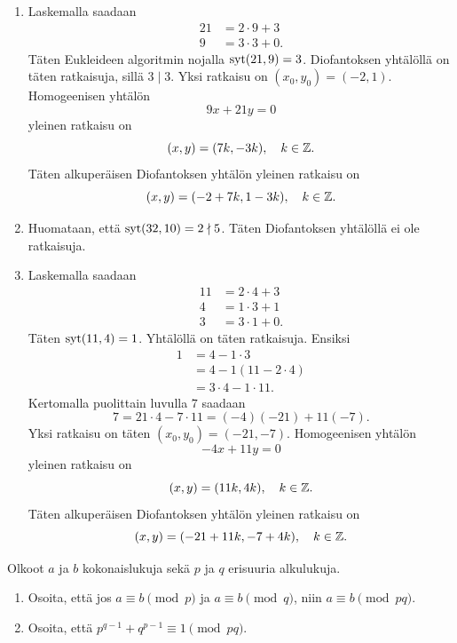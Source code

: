 \documentclass[11pt,a4paper]{amsart}
\begin{document}
\begin{solution}
  \leavevmode\par
  \begin{enumerate}[label=(\alph*), nosep]
    \item Laskemalla saadaan
      \[
        \begin{aligned}
          21 &= 2 \cdot 9 + 3 \\
          9 &= 3 \cdot 3 + 0.
        \end{aligned}
      \]
      Täten Eukleideen algoritmin nojalla \(\operatorname{syt}(21, 9) = 3\). Diofantoksen
      yhtälöllä on täten ratkaisuja, sillä \(3 \mid 3\). Yksi ratkaisu on
      \((x_0, y_0) = (-2, 1)\). Homogeenisen yhtälön
      \[
        9x + 21y = 0
      \]
      yleinen ratkaisu on
      \[
        (x, y) = (7k, -3k), \quad k \in \mathbb{Z}.
      \]
      Täten alkuperäisen Diofantoksen yhtälön yleinen ratkaisu on
      \[
        (x, y) = (-2 + 7k, 1 - 3k), \quad k \in \mathbb{Z}.
      \]
    \item Huomataan, että \(\operatorname{syt}(32, 10) = 2 \nmid 5\). Täten Diofantoksen
      yhtälöllä ei ole ratkaisuja.
    \item Laskemalla saadaan
      \[
        \begin{aligned}
          11 &= 2 \cdot 4 + 3 \\
          4 &= 1 \cdot 3 + 1 \\
          3 &= 3 \cdot 1 + 0.
        \end{aligned}
      \]
      Täten \(\operatorname{syt}(11, 4) = 1\). Yhtälöllä on täten ratkaisuja. Ensiksi
      \[
        \begin{aligned}
          1 &= 4 - 1 \cdot 3 \\
          &= 4 - 1(11 - 2 \cdot 4) \\
          &= 3 \cdot 4 - 1 \cdot 11.
        \end{aligned}
      \]
      Kertomalla puolittain luvulla \(7\) saadaan
      \[
        7 = 21 \cdot 4 - 7 \cdot 11 = (-4)(-21) + 11(-7).
      \]
      Yksi ratkaisu on täten \((x_0, y_0) = (-21, -7)\). Homogeenisen yhtälön
      \[
        -4x + 11y = 0
      \]
      yleinen ratkaisu on
      \[
        (x, y) = (11k, 4k), \quad k \in \mathbb{Z}.
      \]
      Täten alkuperäisen Diofantoksen yhtälön yleinen ratkaisu on
      \[
        (x, y) = (-21 + 11k, -7 + 4k), \quad k \in \mathbb{Z}.
      \]
  \end{enumerate}
\end{solution}

\begin{exercise}
  Olkoot \(a\) ja \(b\) kokonaislukuja sekä \(p\) ja \(q\) erisuuria
  alkulukuja.
  \begin{enumerate}[label=(\alph*), nosep]
    \item Osoita, että jos \(a \equiv b \pmod{p}\) ja
      \(a \equiv b \pmod{q}\), niin \(a \equiv b \pmod{pq}\).
    \item Osoita, että \(p^{q-1} + q^{p-1} \equiv 1 \pmod{pq}\).
  \end{enumerate}
\end{exercise}
\end{document}
